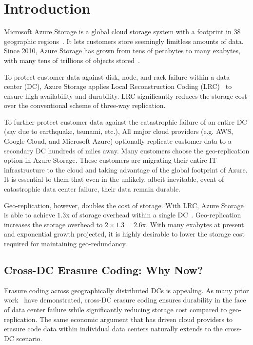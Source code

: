 \section{Introduction}

Microsoft Azure Storage is a global cloud storage system with a footprint in 38 geographic regions~\cite{bib:azureregions}. It lets customers store seemingly limitless amounts of data. Since 2010, Azure Storage has grown from tens of petabytes to many exabytes, with many tens of trillions of objects stored~\cite{greenberg15sdn}.


To protect customer data against disk, node, and rack failure within a data center (DC), Azure Storage applies Local Reconstruction Coding (LRC)~\cite{huang12erasure} to ensure high availability and durability. LRC significantly reduces the storage cost over the conventional scheme of three-way replication. %


To further protect customer data against the catastrophic failure of an entire DC (say due to earthquake, tsunami, etc.), All major cloud providers (e.g. AWS, Google Cloud, and Microsoft Azure) optionally replicate customer data to a secondary DC hundreds of miles away. Many customers choose the geo-replication option in Azure Storage. These customers are migrating their entire IT infrastructure to the cloud and taking advantage of the global footprint of Azure. It is essential to them that even in the unlikely, albeit inevitable, event of catastrophic data center failure, their data remain durable.

Geo-replication, however, doubles the cost of storage. With LRC, Azure Storage is able to achieve $1.3$x of storage overhead within a single DC~\cite{huang12erasure}. Geo-replication increases the storage overhead to $2 \times 1.3 = 2.6$x. With many exabytes at present and exponential growth projected, it is highly desirable to lower the storage cost required for maintaining geo-redundancy.

\subsection{Cross-DC Erasure Coding: Why Now?}

Erasure coding across geographically distributed DCs is appealing. As many prior work~\cite{oceanstore:asplos00, pond:fast03, weatherspoon05long, hail:ccs09, racs:socc10, hu12nccloud} have demonstrated, cross-DC erasure coding ensures durability in the face of data center failure while significantly reducing storage cost compared to geo-replication. The same economic argument that has driven cloud providers to erasure code data within individual data centers naturally extends to the cross-DC scenario.

